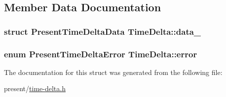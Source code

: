 \subsection{\-Member \-Data \-Documentation}
\hypertarget{structTimeDelta_ab88989772d6ab486e1e008238d96eb81}{
\subsubsection[{data\-\_\-}]{\setlength{\rightskip}{0pt plus 5cm}struct \-Present\-Time\-Delta\-Data {\bf \-Time\-Delta\-::data\-\_\-}}}\label{structTimeDelta_ab88989772d6ab486e1e008238d96eb81}
\hypertarget{structTimeDelta_a212d89d50dc636a4e12ceac5fd9f0bfd}{
\subsubsection[{error}]{\setlength{\rightskip}{0pt plus 5cm}enum {\bf \-Present\-Time\-Delta\-Error} {\bf \-Time\-Delta\-::error}}}\label{structTimeDelta_a212d89d50dc636a4e12ceac5fd9f0bfd}


\-The documentation for this struct was generated from the following file\-:\begin{DoxyCompactItemize}
\item 
present/\hyperlink{time-delta_8h}{time-\/delta.\-h}\end{DoxyCompactItemize}
